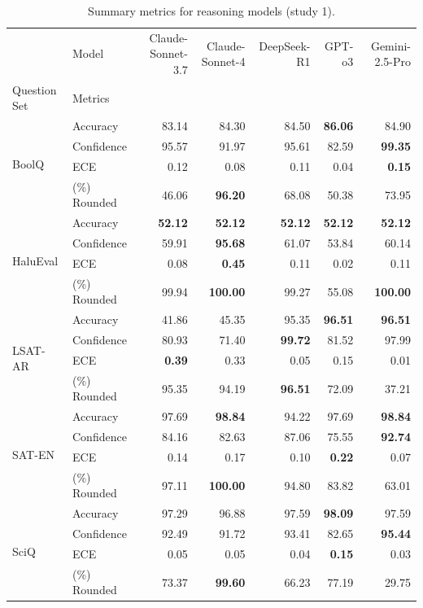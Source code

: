 \begin{table}
\caption{Summary metrics for reasoning models (study 1).}
\label{tab:study1_summary_reasoning}
\begin{tabular}{llrrrrr}
\toprule
 & Model & Claude-Sonnet-3.7 & Claude-Sonnet-4 & DeepSeek-R1 & GPT-o3 & Gemini-2.5-Pro \\
Question Set & Metrics &  &  &  &  &  \\
\midrule
\multirow[c]{4}{*}{BoolQ} & Accuracy & 83.14 & 84.30 & 84.50 & \textbf{86.06} & 84.90 \\
 & Confidence & 95.57 & 91.97 & 95.61 & 82.59 & \textbf{99.35} \\
 & ECE & 0.12 & 0.08 & 0.11 & 0.04 & \textbf{0.15} \\
 & (\%) Rounded & 46.06 & \textbf{96.20} & 68.08 & 50.38 & 73.95 \\
\multirow[c]{4}{*}{HaluEval} & Accuracy & \textbf{52.12} & \textbf{52.12} & \textbf{52.12} & \textbf{52.12} & \textbf{52.12} \\
 & Confidence & 59.91 & \textbf{95.68} & 61.07 & 53.84 & 60.14 \\
 & ECE & 0.08 & \textbf{0.45} & 0.11 & 0.02 & 0.11 \\
 & (\%) Rounded & 99.94 & \textbf{100.00} & 99.27 & 55.08 & \textbf{100.00} \\
\multirow[c]{4}{*}{LSAT-AR} & Accuracy & 41.86 & 45.35 & 95.35 & \textbf{96.51} & \textbf{96.51} \\
 & Confidence & 80.93 & 71.40 & \textbf{99.72} & 81.52 & 97.99 \\
 & ECE & \textbf{0.39} & 0.33 & 0.05 & 0.15 & 0.01 \\
 & (\%) Rounded & 95.35 & 94.19 & \textbf{96.51} & 72.09 & 37.21 \\
\multirow[c]{4}{*}{SAT-EN} & Accuracy & 97.69 & \textbf{98.84} & 94.22 & 97.69 & \textbf{98.84} \\
 & Confidence & 84.16 & 82.63 & 87.06 & 75.55 & \textbf{92.74} \\
 & ECE & 0.14 & 0.17 & 0.10 & \textbf{0.22} & 0.07 \\
 & (\%) Rounded & 97.11 & \textbf{100.00} & 94.80 & 83.82 & 63.01 \\
\multirow[c]{4}{*}{SciQ} & Accuracy & 97.29 & 96.88 & 97.59 & \textbf{98.09} & 97.59 \\
 & Confidence & 92.49 & 91.72 & 93.41 & 82.65 & \textbf{95.44} \\
 & ECE & 0.05 & 0.05 & 0.04 & \textbf{0.15} & 0.03 \\
 & (\%) Rounded & 73.37 & \textbf{99.60} & 66.23 & 77.19 & 29.75 \\
\bottomrule
\end{tabular}
\end{table}
